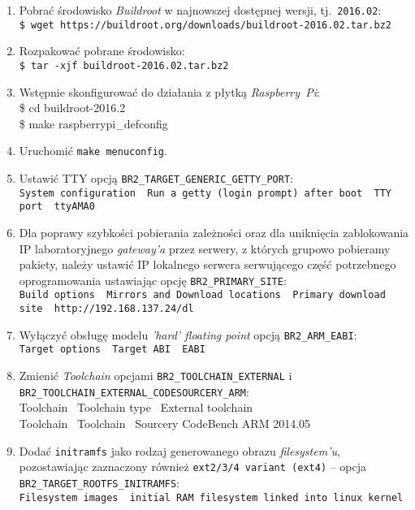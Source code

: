 \documentclass{article}
\newenvironment{ttblock}{\ttfamily}{\par}
\begin{document}
\begin{enumerate}
\item Pobrać środowisko \emph{Buildroot} w najnowszej dostępnej wersji, tj.~\texttt{2016.02}:\\
\texttt{\$ wget https://buildroot.org/downloads/buildroot-2016.02.tar.bz2}

\item Rozpakować pobrane środowisko:\\
\texttt{\$ tar -xjf buildroot-2016.02.tar.bz2}

\item Wstępnie skonfigurować do działania z płytką \emph{Raspberry~Pi}:\\
\begin{ttblock}
\$ cd buildroot-2016.2\\
\$ make raspberrypi\_defconfig
\end{ttblock}

\item Uruchomić \texttt{make menuconfig}.

\item Ustawić TTY opcją \texttt{BR2\_TARGET\_GENERIC\_GETTY\_PORT}:\\
\texttt{System configuration \textrightarrow\ Run a getty (login prompt) after boot \textrightarrow\ TTY port \textrightarrow\ ttyAMA0}

\item Dla poprawy szybkości pobierania zależności oraz dla uniknięcia zablokowania IP laboratoryjnego \emph{gateway'a} przez serwery, z których grupowo pobieramy pakiety, należy ustawić IP lokalnego serwera serwującego część potrzebnego oprogramowania ustawiając opcję \texttt{BR2\_PRIMARY\_SITE}:\\
\texttt{Build options \textrightarrow\ Mirrors and Download locations \textrightarrow\ Primary download site \textrightarrow\ http://192.168.137.24/dl}

\item Wyłączyć obsługę modelu \emph{'hard' floating point} opcją \texttt{BR2\_ARM\_EABI}:\\
\texttt{Target options \textrightarrow\ Target ABI \textrightarrow\ EABI}

\item Zmienić \emph{Toolchain} opcjami \texttt{BR2\_TOOLCHAIN\_EXTERNAL} i\\ \texttt{BR2\_TOOLCHAIN\_EXTERNAL\_CODESOURCERY\_ARM}:\\
\begin{ttblock}
Toolchain \textrightarrow\ Toolchain type \textrightarrow\ External toolchain\\
Toolchain \textrightarrow\ Toolchain \textrightarrow\ Sourcery CodeBench ARM 2014.05
\end{ttblock}

\item Dodać \texttt{initramfs} jako rodzaj generowanego obrazu \emph{filesystem'u}, pozostawiając zaznaczony również \texttt{ext2/3/4 variant (ext4)} -- opcja \\\texttt{BR2\_TARGET\_ROOTFS\_INITRAMFS}:\\
\texttt{Filesystem images \textrightarrow\ initial RAM filesystem linked into linux kernel}
\end{enumerate}
\end{document}
